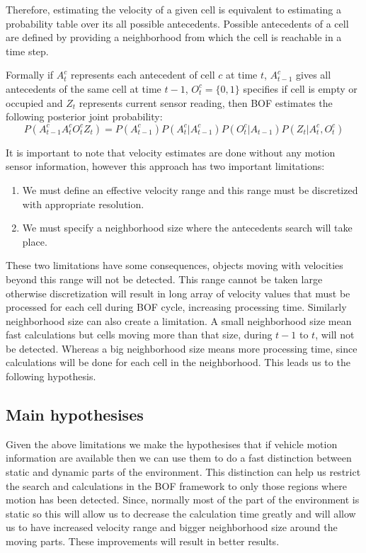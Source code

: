 Therefore, estimating the velocity of a given cell is equivalent to estimating a probability table over its all possible antecedents. Possible antecedents of a cell are defined by providing a neighborhood from which the cell is reachable in a time step.

Formally if $A_t^c$ represents each antecedent of cell $c$ at time $t$, $A_{t-1}^c$ gives all antecedents of the same cell at time $t-1$, $O_t^c=\{0,1\}$ specifies if cell is empty or occupied and $Z_t$ represents current sensor reading, then BOF estimates the following posterior joint probability:
\begin{equation}
P(A_{t-1}^c A_t^c O_t^c Z_t) = P(A_{t-1}^c)P(A_t^c|A_{t-1}^c)P(O_t^c|A_{t-1})P(Z_t|A_t^c,O_t^c)
\end{equation}

It is important to note that velocity estimates are done without any motion sensor information, however this approach has two important limitations:
\begin{enumerate}
\item We must define an effective velocity range and this range must be discretized with appropriate resolution.
\item We must specify a neighborhood size where the antecedents search will take place.
\end{enumerate}
These two limitations have some consequences, objects moving with velocities beyond this range will not be detected. This range cannot be taken large otherwise discretization will result in long array of velocity values that must be processed for each cell during BOF cycle, increasing processing time. Similarly neighborhood size can also create a limitation. A small neighborhood size mean fast calculations but cells moving more than that size, during $t-1$ to $t$, will not be detected. Whereas a big neighborhood size means more processing time, since calculations will be done for each cell in the neighborhood. This leads us to the following hypothesis.

\subsection{Main hypothesises}
Given the above limitations we make the hypothesises that if vehicle motion information are available then we can use them to do a fast distinction between static and dynamic parts of the environment. This distinction can help us restrict the search and calculations in the BOF framework to only those regions where motion has been detected. Since, normally most of the part of the environment is static so this will allow us to decrease the calculation time greatly and will allow us to have increased velocity range and bigger neighborhood size around the moving parts. These improvements will result in better results.

